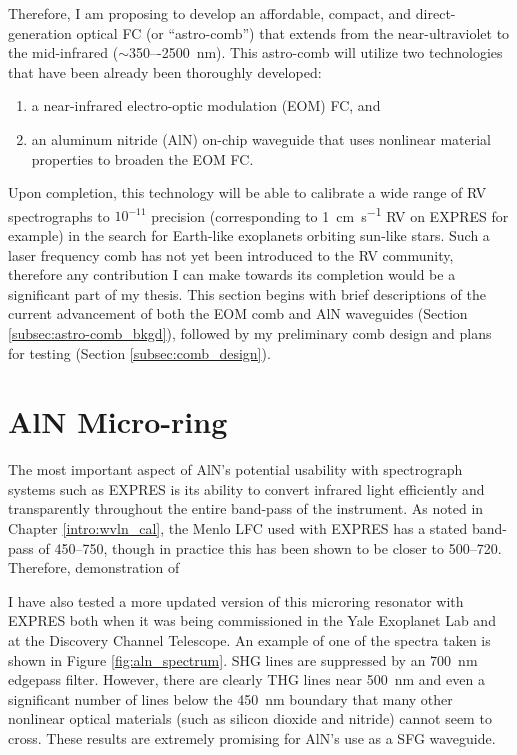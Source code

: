 Therefore, I am proposing to develop an affordable, compact, and direct-generation optical FC (or ``astro-comb'') that extends from the near-ultraviolet to the mid-infrared ($\sim$350–-\SI{2500}{\nano\meter}). This astro-comb will utilize two technologies that have been already been thoroughly developed:
\begin{enumerate}
    \item a near-infrared electro-optic modulation (EOM) FC, and
    \item an aluminum nitride (AlN) on-chip waveguide that uses nonlinear material properties to broaden the EOM FC.
\end{enumerate}
Upon completion, this technology will be able to calibrate a wide range of RV spectrographs to $10^{-11}$ precision (corresponding to \SI{1}{\centi\meter\per\second} RV on EXPRES for example) in the search for Earth-like exoplanets orbiting sun-like stars. Such a laser frequency comb has not yet been introduced to the RV community, therefore any contribution I can make towards its completion would be a significant part of my thesis. This section begins with brief descriptions of the current advancement of both the EOM comb and AlN waveguides (Section \ref{subsec:astro-comb_bkgd}), followed by my preliminary comb design and plans for testing (Section \ref{subsec:comb_design}).

\section{AlN Micro-ring}\label{astro-comb:micro-ring}

The most important aspect of AlN's potential usability with spectrograph systems such as EXPRES is its ability to convert infrared light efficiently and transparently throughout the entire band-pass of the instrument. As noted in Chapter \ref{intro:wvln_cal}, the Menlo LFC used with EXPRES has a stated band-pass of 450--750\nm, though in practice this has been shown to be closer to 500--720\nm. Therefore, demonstration of 

I have also tested a more updated version of this microring resonator with EXPRES both when it was being commissioned in the Yale Exoplanet Lab and at the Discovery Channel Telescope. An example of one of the spectra taken is shown in Figure \ref{fig:aln_spectrum}. SHG lines are suppressed by an \SI{700}{\nano\meter} edgepass filter. However, there are clearly THG lines near \SI{500}{\nano\meter} and even a significant number of lines below the \SI{450}{\nano\meter} boundary that many other nonlinear optical materials (such as silicon dioxide and nitride) cannot seem to cross. These results are extremely promising for AlN's use as a SFG waveguide.

